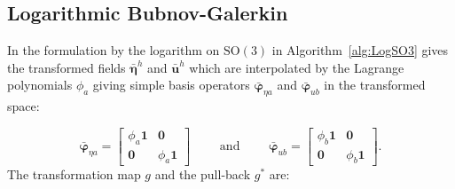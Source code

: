 \hypertarget{sec:element-ifk}{%
\subsection{Logarithmic Bubnov-Galerkin}\label{sec:element-ifk}}

In the formulation by \cite{ibrahimbegović1995computational} the
logarithm on \(\mathrm{SO}(3)\) in Algorithm~\ref{alg:LogSO3} gives the
transformed fields \(\bar{\bm{\eta}}^h\) and \(\bar{\bm{u}}^h\) which are
interpolated by the Lagrange polynomials \(\phi_a\) 
giving simple basis operators
\(\bar{\bm{\varphi}}^{}_{\eta a}\) and \(\bar{\bm{\varphi}}_{u b}\) in the transformed space:

\begin{equation}
\bar{\bm{\varphi}}^{}_{\eta a} = 
    \begin{bmatrix}
    \phi_a \mathbf{1} & \mathbf{0} \\
    \mathbf{0} & \phi_a \mathbf{1}
\end{bmatrix}
\qquad\text{ and }\qquad
\bar{\bm{\varphi}}_{u b} = \begin{bmatrix}
    \phi_b \mathbf{1} & \mathbf{0} \\
    \mathbf{0} & \phi_b \mathbf{1}
\end{bmatrix}.
\label{eq:interp-ifk}\end{equation}
The transformation map \(g\) and the pull-back \(g^*\) are:

